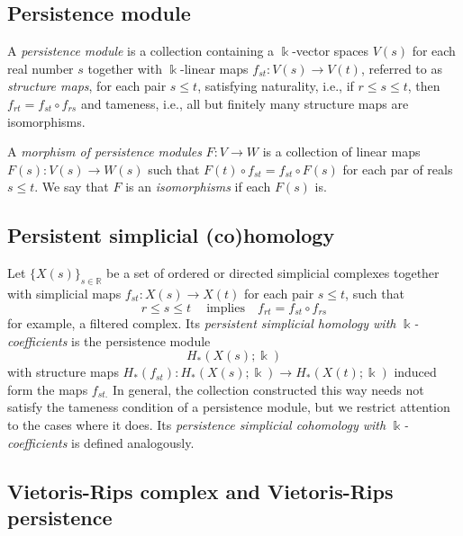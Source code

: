 \documentclass{amsart}
\begin{document}
	\subsection*{Persistence module} \label{persistence_module}
	
	A \textit{persistence module} is a collection containing a $\Bbbk$-vector spaces $V(s)$ for each real number $s$ together with $\Bbbk$-linear maps $f_{st} : V(s) \to V(t)$, referred to as \textit{structure maps}, for each pair $s \leq t$, satisfying	naturality, i.e., if $r \leq s \leq t$, then $f_{rt} = f_{st} \circ f_{rs}$ and tameness, i.e., all but finitely many structure maps are isomorphisms.
	
	A \textit{morphism of persistence modules} $F : V \to W$ is a collection of linear maps $F(s) : V(s) \to W(s)$ such that $F(t) \circ f_{st} = f_{st} \circ F(s)$ for each par of reals $s \leq t$.	We say that $F$ is an \textit{isomorphisms} if each $F(s)$ is.
	
	\subsection*{Persistent simplicial (co)homology} \label{persistent_simplicial_(co)homology}
	
	Let $\{X(s)\}_{s \in \mathbb R} $ be a set of ordered or directed simplicial complexes together with simplicial maps $f_{st} : X(s) \to X(t)$ for each pair $s \leq t$, such that 
	\begin{equation*}
	r \leq s \leq t\ \quad\text{implies} \quad f_{rt} = f_{st} \circ f_{rs}
	\end{equation*}
	for example, a 
	filtered complex. Its \textit{persistent simplicial homology with} $\Bbbk$\textit{-coefficients} is the persistence module
	\begin{equation*}
	H_*(X(s); \Bbbk)
	\end{equation*}
	with structure maps $H_*(f_{st}) : H_*(X(s); \Bbbk) \to H_*(X(t); \Bbbk)$ induced form the maps $f_{st.}$ In general, the collection constructed this way needs not satisfy the tameness condition of a 
	persistence module, but we restrict attention to the cases where it does. Its \textit{persistence simplicial cohomology with} $\Bbbk$\textit{-coefficients} is defined analogously.
	
	\subsection*{Vietoris-Rips complex and Vietoris-Rips persistence} \label{vietoris-rips_complex_and_vietoris-rips_persistence}
	
\end{document}
